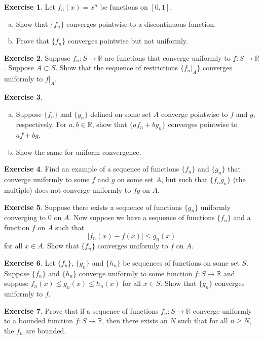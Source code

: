 \documentclass[12pt,openany]{book}
\newcommand{\abs}[1]{\left\lvert {#1} \right\rvert}
\newcommand{\R}{{\mathbb{R}}}
\theoremstyle{plain}
\theoremstyle{remark}
\theoremstyle{definition}
\newenvironment{exbox}{%
    \def\FrameCommand{\vrule width 1pt \relax\hspace{10pt}}%
    \MakeFramed{\advance\hsize-\width\FrameRestore}%
}{%
    \endMakeFramed
}
\newenvironment{exparts}{%
    \leavevmode\begin{enumerate}[a),noitemsep,topsep=0pt,parsep=0pt,partopsep=0pt]
}{%
    \end{enumerate}
}
\theoremstyle{exercise}
\newtheorem{exercise}{Exercise}[section]
\theoremstyle{example}
\begin{document}
\begin{exbox}
\begin{exercise} \label{exercise:limitnotcont}
Let $f_n(x)=x^n$ be functions on $[0,1]$.
\begin{exparts}
\item
Show that $\{ f_n \}$ converges pointwise to a discontinuous function.
\item
Prove that $\{ f_n \}$ converges
pointwise but not uniformly.
\end{exparts}
\end{exercise}

\begin{exercise}
Suppose $f_n \colon S \to \R$ are functions that converge uniformly
to $f \colon S \to \R$.  Suppose $A \subset S$.  Show that
the sequence of restrictions $\{ f_n|_A \}$ converges uniformly to $f|_A$.
\end{exercise}

\begin{exercise}
\begin{exparts}
\item
Suppose $\{ f_n \}$ and $\{ g_n \}$ defined on some set $A$ converge
pointwise to $f$ and $g$, respectively.
For $a,b \in \R$,
show that $\{ a f_n+ b g_n \}$ converges pointwise to $a f+ b g$.
\item
Show the same for uniform convergence.
\end{exparts}
\end{exercise}

\begin{exercise}
Find an example of a sequence of functions $\{ f_n \}$ and $\{ g_n \}$
that converge uniformly to some $f$ and $g$ on some set $A$, but such that
$\{ f_ng_n \}$ (the multiple) does not converge uniformly to $fg$ on $A$.
\end{exercise}

\begin{exercise}
Suppose there exists a sequence of functions $\{ g_n \}$ uniformly
converging to $0$ on $A$.  Now suppose we have a sequence of functions
$\{ f_n \}$ and a function $f$ on $A$ such that
\begin{equation*}
\abs{f_n(x) - f(x)} \leq g_n(x) 
\end{equation*}
for all $x \in A$.  Show that $\{ f_n \}$ converges uniformly to $f$ on $A$.
\end{exercise}

\begin{exercise}
Let $\{ f_n \}$, $\{ g_n \}$ and $\{ h_n \}$ be sequences of functions on
some set $S$.
Suppose $\{ f_n \}$ and $\{ h_n \}$ converge uniformly to some function
$f \colon S \to \R$ and suppose $f_n(x) \leq g_n(x) \leq h_n(x)$
for all $x \in S$.  Show that $\{ g_n \}$ converges uniformly to $f$.
\end{exercise}

\begin{exercise}
Prove that
if a sequence of functions $f_n \colon S \to \R$
converge uniformly to a bounded function $f \colon S \to \R$,
then there exists an $N$ such that for all $n \geq N$, the $f_n$
are bounded.
\end{exercise}
\end{exbox}
\end{document}

